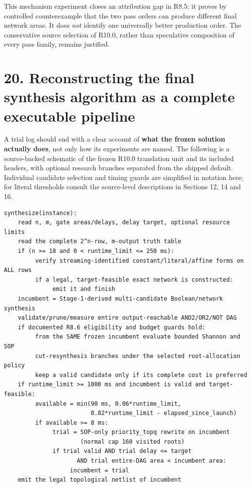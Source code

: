 \documentclass[a4paper,10pt]{article}
\theoremstyle{definition}
\theoremstyle{remark}
\begin{document}
This mechanism experiment closes an attribution gap in R8.5: it proves by controlled counterexample that the two pass orders can produce different final network areas. It does \emph{not} identify one universally better production order. The conservative source selection of R10.0, rather than speculative composition of every pass family, remains justified.

\section{20. Reconstructing the final synthesis algorithm as a complete executable pipeline}\label{reconstructing-the-final-synthesis-algorithm-as-a-complete-executable-pipeline}

A trial log should end with a clear account of \textbf{what the frozen solution actually does}, not only how its experiments are named. The following is a source-backed schematic of the frozen R10.0 translation unit and its included headers, with optional research branches separated from the shipped default. Individual candidate selection and timing guards are simplified in notation here; for literal thresholds consult the source-level descriptions in Sections 12, 14 and 16.

\begin{verbatim}
synthesize(instance):
    read n, m, gate areas/delays, delay target, optional resource limits
    read the complete 2^n-row, m-output truth table
    if (n >= 18 and 0 < runtime_limit <= 250 ms):
         verify streaming-identified constant/literal/affine forms on ALL rows
         if a legal, target-feasible exact network is constructed:
              emit it and finish
    incumbent = Stage-1-derived multi-candidate Boolean/network synthesis
    validate/prune/measure entire output-reachable AND2/OR2/NOT DAG
    if documented R8.6 eligibility and budget guards hold:
         from the SAME frozen incumbent evaluate bounded Shannon and SOP
         cut-resynthesis branches under the selected root-allocation policy
         keep a valid candidate only if its complete cost is preferred
    if runtime_limit >= 1000 ms and incumbent is valid and target-feasible:
         available = min(90 ms, 0.06*runtime_limit,
                         0.82*runtime_limit - elapsed_since_launch)
         if available >= 8 ms:
              trial = SOP-only priority_topq rewrite on incumbent
                      (normal cap 160 visited roots)
              if trial valid AND trial delay <= target
                     AND trial entire-DAG area < incumbent area:
                   incumbent = trial
    emit the legal topological netlist of incumbent
\end{verbatim}
\end{document}
